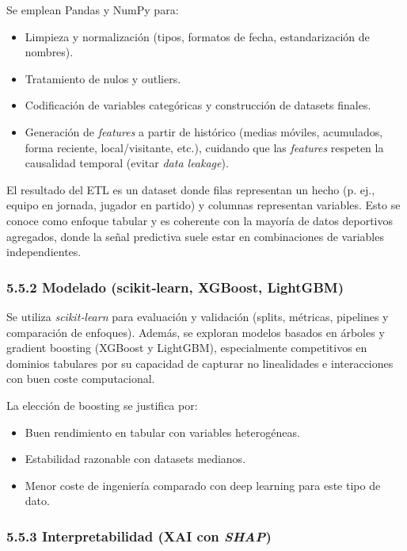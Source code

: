 Se emplean Pandas y NumPy para:

\begin{itemize}
\item Limpieza y normalización (tipos, formatos de fecha, estandarización de nombres).
\item Tratamiento de nulos y outliers.
\item Codificación de variables categóricas y construcción de datasets finales.
\item Generación de \textit{features} a partir de histórico (medias móviles, acumulados, forma reciente, 
local/visitante, etc.), cuidando que las \textit{features} respeten la causalidad temporal (evitar 
\textit{data leakage}).
\end{itemize}

El resultado del ETL es un dataset donde filas representan un hecho (p. ej., equipo en jornada, 
jugador en partido) y columnas representan variables. Esto se conoce como enfoque tabular y es coherente con la 
mayoría de datos deportivos agregados, donde la señal predictiva suele estar en combinaciones de 
variables independientes.

\subsubsection{5.5.2 Modelado (scikit‑learn, XGBoost, LightGBM)}

Se utiliza \textit{scikit‑learn} para evaluación y validación (splits, métricas, pipelines y comparación de 
enfoques). Además, se exploran modelos basados en árboles y gradient boosting (XGBoost y LightGBM), 
especialmente competitivos en dominios tabulares por su capacidad de capturar no linealidades e 
interacciones con buen coste computacional.

La elección de boosting se justifica por:

\begin{itemize}
\item Buen rendimiento en tabular con variables heterogéneas.
\item Estabilidad razonable con datasets medianos.
\item Menor coste de ingeniería comparado con deep learning para este tipo de dato.
\end{itemize}

\subsubsection{5.5.3 Interpretabilidad (XAI con \textit{SHAP})}

